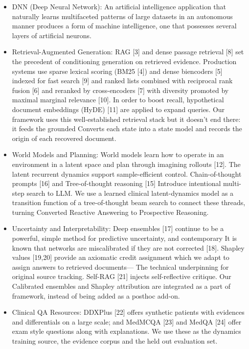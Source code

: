 \begin{itemize}
\vspace{1em}

\item DNN (Deep Neural Network): An artificial intelligence application that naturally learns multifaceted patterns of large datasets in an autonomous manner produces a form of machine intelligence, one that possesses several layers of artificial neurons.

\vspace{1em}

\item Retrieval-Augmented Generation: RAG [3] and dense passage retrieval [8] set the precedent of conditioning generation on
retrieved evidence. Production systems use sparse lexical scoring (BM25 [4]) and dense biencoders [5] indexed for fast search [9] and ranked lists combined with reciprocal rank fusion [6] and reranked by cross-encoders [7] with diversity promoted by maximal marginal relevance [10].
In order to boost recall, hypothetical document embeddings (HyDE) [11] are applied to expand queries. Our
framework uses this well-established retrieval stack but it doesn't end there: it feeds the grounded
Converts each state into a state model and records the origin of each recovered document.

\vspace{1em}

\item World Models and Planning: World models learn how to operate in an environment in a latent space and plan through imagining rollouts [12]. The latent recurrent dynamics support
sample-efficient control. Chain-of-thought prompts [16] and Tree-of-thought reasoning [15]
Introduce intentional multi-step search to LLM. We use a learned clinical latent-dynamics model as a transition function of a tree-of-thought beam search to connect these threads, turning
Converted Reactive Answering to Prospective Reasoning.

\vspace{1em}

\item Uncertainty and Interpretability: Deep ensembles [17] continue to be a powerful, simple method for predictive uncertainty, and contemporary
It is known that networks are miscalibrated if they are not corrected [18]. Shapley values [19,20] provide
an axiomatic credit assignment which we adapt to assign answers to retrieved documents—
The technical underpinning for original source tracking. Self-RAG [21] injects self-reflective critique. Our
Calibrated ensembles and Shapley attribution are integrated as a part of framework, instead of being added as a posthoc add-on.

\vspace{1em}

\item Clinical QA Resources: DDXPlus [22] offers synthetic patients with evidences and differentials on a large scale; and
MedMCQA [23] and MedQA [24] offer exam style questions along with explanations. We use these
as the dynamics training source, the evidence corpus and the held out evaluation
set.


\end{itemize}
